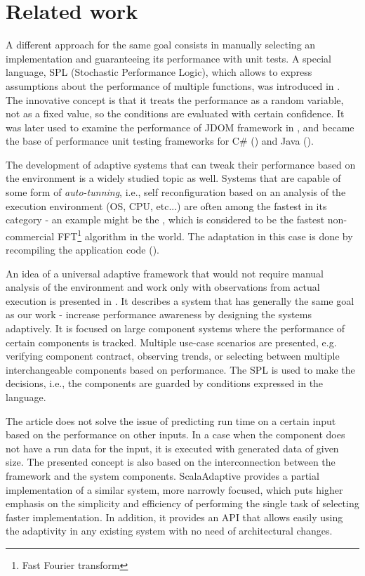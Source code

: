 \chapter{Related work}

A different approach for the same goal consists in manually selecting an implementation and guaranteeing its performance with unit tests. A special language, SPL (Stochastic Performance Logic), which allows to express assumptions about the performance of multiple functions, was introduced in \cite{bulej_capturing_2012}. The innovative concept is that it treats the performance as a random variable, not as a fixed value, so the conditions are evaluated with certain confidence. It was later used to examine the performance of JDOM framework in \cite{horky_performance_2013}, and became the base of performance unit testing frameworks for C\# (\cite{Trojanek:Thesis:2013}) and Java (\cite{Kotrc:Thesis:2015}).

The development of adaptive systems that can tweak their performance based on the environment is a widely studied topic as well. Systems that are capable of some form of \textit{auto-tunning}, i.e., self reconfiguration based on an analysis of the execution environment (OS, CPU, etc...) are often among the fastest in its category - an example might be the \cite{frigo_fftw:_1998},  which is considered to be the fastest non-commercial FFT\footnote{Fast Fourier transform} algorithm in the world. The adaptation in this case is done by recompiling the application code (\cite{frigo_fast_1999}).

An idea of a universal adaptive framework that would not require manual analysis of the environment and work only with observations from actual execution is presented in \cite{bulej_performance_2012}. It describes a system that has generally the same goal as our work - increase performance awareness by designing the systems adaptively. It is focused on large component systems where the performance of certain components is tracked. Multiple use-case scenarios are presented, e.g. verifying component contract, observing trends, or selecting between multiple interchangeable components based on performance. The SPL is used to make the decisions, i.e., the components are guarded by conditions expressed in the language.

The article does not solve the issue of predicting run time on a certain input based on the performance on other inputs. In a case when the component does not have a run data for the input, it is executed with generated data of given size. The presented concept is also based on the interconnection between the framework and the system components. ScalaAdaptive provides a partial implementation of a similar system, more narrowly focused, which puts higher emphasis on the simplicity and efficiency of performing the single task of selecting faster implementation. In addition, it provides an API that allows easily using the adaptivity in any existing system with no need of architectural changes.

